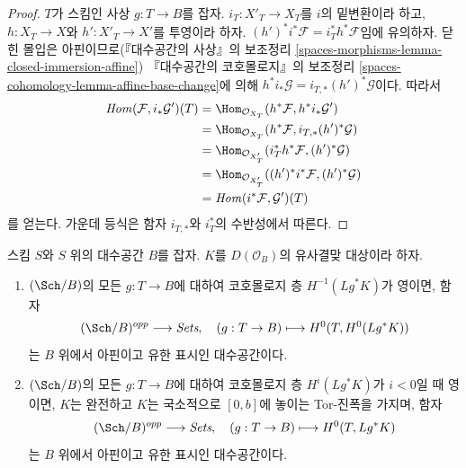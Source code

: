 \begin{proof}
$T$가 스킴인 사상 $g : T \to B$를 잡자.
$i_T : X'_T \to X_T$를 $i$의 밑변환이라 하고,
$h : X_T \to X$와 $h' : X'_T \to X'$를 투영이라 하자.
$(h')^*i^*\mathcal{F} = i_T^*h^*\mathcal{F}$임에 유의하자.
닫힌 몰입은 아핀이므로(『대수공간의 사상』의 보조정리
\ref{spaces-morphisms-lemma-closed-immersion-affine})
『대수공간의 코호몰로지』의 보조정리
\ref{spaces-cohomology-lemma-affine-base-change}에 의해
$h^*i_*\mathcal{G} = i_{T, *}(h')^*\mathcal{G}$이다.
따라서
\begin{align*}
\mathit{Hom}(\mathcal{F}, i_*\mathcal{G}')(T)
& =
\Hom_{\mathcal{O}_{X_T}}(h^*\mathcal{F}, h^*i_*\mathcal{G}') \\
& =
\Hom_{\mathcal{O}_{X_T}}(h^*\mathcal{F}, i_{T, *}(h')^*\mathcal{G}) \\
& =
\Hom_{\mathcal{O}_{X'_T}}(i_T^*h^*\mathcal{F}, (h')^*\mathcal{G}) \\
& =
\Hom_{\mathcal{O}_{X'_T}}((h')^*i^*\mathcal{F}, (h')^*\mathcal{G}) \\
& =
\mathit{Hom}(i^*\mathcal{F}, \mathcal{G}')(T)
\end{align*}
를 얻는다. 가운데 등식은 함자 $i_{T, *}$와 $i_T^*$의 수반성에서 따른다.
\end{proof}

\begin{lemma}
\label{lemma-cohomology-perfect-complex}
스킴 $S$와 $S$ 위의 대수공간 $B$를 잡자.
$K$를 $D(\mathcal{O}_B)$의 유사결맞 대상이라 하자.
\begin{enumerate}
\item $(\Sch/B)$의 모든 $g : T \to B$에 대하여 코호몰로지 층
$H^{-1}(Lg^*K)$가 영이면, 함자
$$
(\Sch/B)^{opp} \longrightarrow \textit{Sets},\quad
(g : T \to B) \longmapsto H^0(T, H^0(Lg^*K))
$$
는 $B$ 위에서 아핀이고 유한 표시인 대수공간이다.
\item $(\Sch/B)$의 모든 $g : T \to B$에 대하여 코호몰로지 층
$H^i(Lg^*K)$가 $i < 0$일 때 영이면, $K$는 완전하고
$K$는 국소적으로 $[0, b]$에 놓이는 Tor-진폭을 가지며, 함자
$$
(\Sch/B)^{opp} \longrightarrow \textit{Sets},\quad
(g : T \to B) \longmapsto H^0(T, Lg^*K)
$$
는 $B$ 위에서 아핀이고 유한 표시인 대수공간이다.
\end{enumerate}
\end{lemma}

